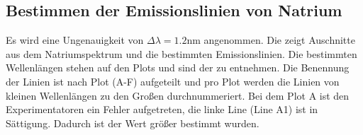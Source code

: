 \subsection*{Bestimmen der Emissionslinien von Natrium}
Es wird eine Ungenauigkeit von $\Delta \lambda = 1.2 \mathrm{nm}$ angenommen. Die  zeigt Auschnitte aus dem Natriumspektrum und die bestimmten Emissionslinien. 
Die bestimmten Wellenlängen stehen auf den Plots und sind der  zu entnehmen. Die Benennung der Linien ist nach Plot (A-F) aufgeteilt und pro Plot werden die Linien von kleinen Wellenlängen zu den Großen durchnummeriert.
Bei dem Plot A ist den Experimentatoren ein Fehler aufgetreten, die linke Line (Line A1) ist in Sättigung. Dadurch ist der Wert größer bestimmt wurden.


